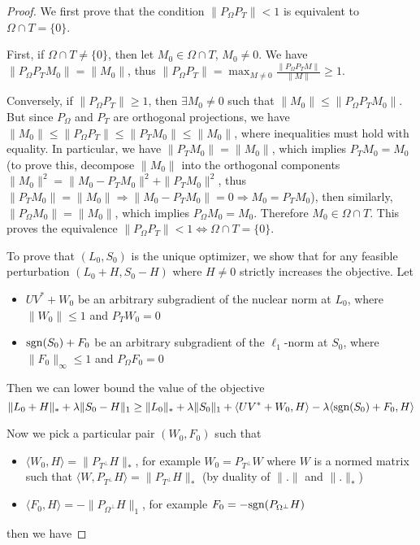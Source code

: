 \begin{proof}
We first prove that the condition $\|P_\Omega P_T\| < 1$ is equivalent to $\Omega \cap T = \{0\}$. 

First, if $\Omega \cap T \neq \{0\}$, then let $M_0 \in \Omega \cap T$, $M_0 \neq 0$. We have $\| P_\Omega P_T M_0\| = \|M_0\|$, thus $\| P_\Omega P_T\| = \max_{M \neq 0} \frac{\| P_\Omega P_T M\|}{\|M\|} \geq 1$. 

Conversely, if $\| P_\Omega P_T\| \geq 1$, then $\exists M_0 \neq 0$ such that $\|M_0\| \leq \| P_\Omega P_T M_0\|$. But since $P_\Omega$ and $P_T$ are orthogonal projections, we have $\|M_0\| \leq \| P_\Omega P_T\| \leq \|P_T M_0\| \leq \|M_0\|$, where inequalities must hold with equality. In particular, we have $\|P_T M_0\| = \|M_0\|$, which implies $P_T M_0 = M_0$ (to prove this, decompose $\|M_0\|$ into the orthogonal components $\|M_0\|^2 = \|M_0 - P_TM_0\|^2 + \|P_TM_0\|^2$, thus $\|P_TM_0\| = \|M_0\| \Rightarrow \|M_0 - P_TM_0\| = 0 \Rightarrow M_0 = P_T M_0$), then similarly, $\|P_\Omega M_0\| = \|M_0\|$, which implies $P_\Omega M_0 = M_0$. Therefore $M_0 \in \Omega \cap T$. This proves the equivalence $\|P_\Omega P_T\| < 1 \Leftrightarrow \Omega \cap T = \{0\}$.



To prove that $(L_0, S_0)$ is the unique optimizer, we show that for any feasible perturbation $(L_0 + H, S_0 - H)$ where $H \neq 0$ strictly increases the objective. Let 
\begin{itemize}
\item $UV^* + W_0$ be an arbitrary subgradient of the nuclear norm at $L_0$, where $\|W_0\| \leq 1$ and $P_T W_0 = 0$
\item $\text{sgn} (S_0) + F_0$ be an arbitrary subgradient of the $\ell_1$-norm at $S_0$, where $\|F_0\|_\infty \leq 1$ and $P_\Omega F_0 = 0$
\end{itemize}

Then we can lower bound the value of the objective
\[
\|L_0 + H\|_* + \lambda \|S_0 - H\|_1 \geq \|L_0\|_* + \lambda \|S_0\|_1 + \langle UV^* + W_0, H\rangle - \lambda \langle \text{sgn}(S_0) + F_0, H\rangle
\]

Now we pick a particular pair $(W_0, F_0)$ such that
\begin{itemize}
\item $\langle W_0, H \rangle = \|P_{T^\perp} H\|_*$, for example $W_0 = P_{T^\perp} W$ where $W$ is a normed matrix such that $\langle W, P_{T^\perp} H \rangle = \|P_{T^\perp} H\|_*$ (by duality of $\|.\|$ and $\|.\|_*$)
\item $\langle F_0, H \rangle = -\|P_{\Omega^\perp} H\|_1$, for example $F_0 = -\text{sgn}(P_{\Omega^\perp} H)$
\end{itemize}
then we have


\end{proof}
